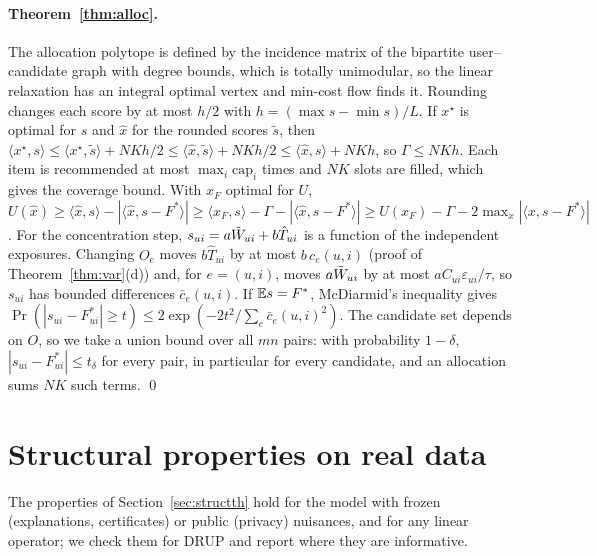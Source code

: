 \paragraph{Theorem~\ref{thm:alloc}.}
The allocation polytope is defined by the incidence matrix of the bipartite
user--candidate graph with degree bounds, which is totally unimodular, so the
linear relaxation has an integral optimal vertex and min-cost flow finds it.
Rounding changes each score by at most $h/2$ with $h=(\max s-\min s)/L$. If
$x^\star$ is optimal for $s$ and $\hat x$ for the rounded scores $\tilde s$, then
$\langle x^\star,s\rangle\le\langle x^\star,\tilde s\rangle+NKh/2\le\langle\hat x,\tilde s\rangle+NKh/2\le\langle\hat x,s\rangle+NKh$, so
$\Gamma\le NKh$. Each item is recommended at most $\max_i\mathrm{cap}_i$ times and $NK$
slots are filled, which gives the coverage bound. With $x_F$ optimal for $U$,
$U(\hat x)\ge\langle\hat x,s\rangle-|\langle\hat x,s-F^*\rangle|\ge\langle x_F,s\rangle-\Gamma-|\langle\hat x,s-F^*\rangle|
\ge U(x_F)-\Gamma-2\max_x|\langle x,s-F^*\rangle|$. For the concentration step,
$s_{ui}=a\tilde W_{ui}+b\hat T_{ui}$ is a function of the independent exposures.
Changing $O_e$ moves $b\hat T_{ui}$ by at most $b\,c_e(u,i)$ (proof of
Theorem~\ref{thm:var}(d)) and, for $e=(u,i)$, moves $a\tilde W_{ui}$ by at most
$aC_{ui}\varepsilon_{ui}/\tau$, so $s_{ui}$ has bounded differences $\bar c_e(u,i)$. If
$\mathbb{E} s=F^*$, McDiarmid's inequality gives
$\Pr(|s_{ui}-F^*_{ui}|\ge t)\le2\exp(-2t^2/\sum_e\bar c_e(u,i)^2)$. The candidate set
depends on $O$, so we take a union bound over all $mn$ pairs: with probability
$1-\delta$, $|s_{ui}-F^*_{ui}|\le t_\delta$ for every pair, in particular for every
candidate, and an allocation sums $NK$ such terms. \qed

\section{Structural properties on real data}\label{sec:struct}

The properties of Section~\ref{sec:structth} hold for the model with frozen
(explanations, certificates) or public (privacy) nuisances, and for any linear
operator; we check them for DRUP and report where they are informative.

\begin{table}[t]\centering\small
\caption{Exact explanations (Proposition~\ref{prop:affine}, Theorem~\ref{thm:cf}) on 200 random
test users: largest relative error of completeness and subset additivity
against re-propagation; rank of the top-1 item after un-logging the five
interactions with the largest attribution, five random ones, or the five most
similar ones (0 = still first); share of top-1 recommendations for which no
subset of the user's own interactions makes the second item overtake it; median
size of the minimal counterfactual explanation otherwise. Every explanation
was verified by re-scoring.}\label{tab:explain}
\begin{adjustbox}{max width=\textwidth}

\end{adjustbox}
\end{table}

